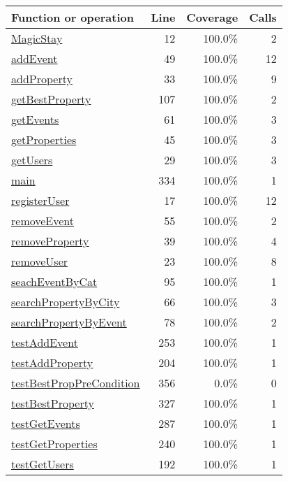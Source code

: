 \begin{longtable}{|l|r|r|r|}
\hline
Function or operation & Line & Coverage & Calls \\
\hline
\hline
\hyperref[MagicStay:12]{MagicStay} & 12&100.0\% & 2 \\
\hline
\hyperref[addEvent:49]{addEvent} & 49&100.0\% & 12 \\
\hline
\hyperref[addProperty:33]{addProperty} & 33&100.0\% & 9 \\
\hline
\hyperref[getBestProperty:107]{getBestProperty} & 107&100.0\% & 2 \\
\hline
\hyperref[getEvents:61]{getEvents} & 61&100.0\% & 3 \\
\hline
\hyperref[getProperties:45]{getProperties} & 45&100.0\% & 3 \\
\hline
\hyperref[getUsers:29]{getUsers} & 29&100.0\% & 3 \\
\hline
\hyperref[main:334]{main} & 334&100.0\% & 1 \\
\hline
\hyperref[registerUser:17]{registerUser} & 17&100.0\% & 12 \\
\hline
\hyperref[removeEvent:55]{removeEvent} & 55&100.0\% & 2 \\
\hline
\hyperref[removeProperty:39]{removeProperty} & 39&100.0\% & 4 \\
\hline
\hyperref[removeUser:23]{removeUser} & 23&100.0\% & 8 \\
\hline
\hyperref[seachEventByCat:95]{seachEventByCat} & 95&100.0\% & 1 \\
\hline
\hyperref[searchPropertyByCity:66]{searchPropertyByCity} & 66&100.0\% & 3 \\
\hline
\hyperref[searchPropertyByEvent:78]{searchPropertyByEvent} & 78&100.0\% & 2 \\
\hline
\hyperref[testAddEvent:253]{testAddEvent} & 253&100.0\% & 1 \\
\hline
\hyperref[testAddProperty:204]{testAddProperty} & 204&100.0\% & 1 \\
\hline
\hyperref[testBestPropPreCondition:356]{testBestPropPreCondition} & 356&0.0\% & 0 \\
\hline
\hyperref[testBestProperty:327]{testBestProperty} & 327&100.0\% & 1 \\
\hline
\hyperref[testGetEvents:287]{testGetEvents} & 287&100.0\% & 1 \\
\hline
\hyperref[testGetProperties:240]{testGetProperties} & 240&100.0\% & 1 \\
\hline
\hyperref[testGetUsers:192]{testGetUsers} & 192&100.0\% & 1 \\

\end{longtable}
